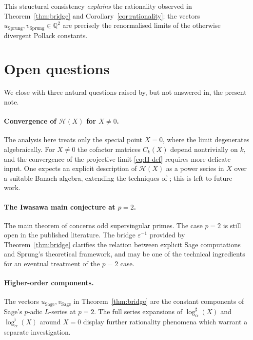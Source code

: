 \documentclass[11pt,a4paper]{amsart}
\theoremstyle{definition}
\newcommand{\Q}{\mathbb{Q}}
\newcommand{\eps}{\varepsilon}
\newcommand{\Hcal}{\mathcal{H}}
\begin{document}
This structural consistency \emph{explains} the rationality observed in Theorem~\ref{thm:bridge} and Corollary~\ref{cor:rationality}: the vectors $u_{\mathrm{Sprung}}, v_{\mathrm{Sprung}} \in \Q^2$ are precisely the renormalised limits of the otherwise divergent Pollack constants.

\section{Open questions}\label{sec:open}

We close with three natural questions raised by, but not answered in, the present note.

\paragraph{Convergence of $\Hcal(X)$ for $X \neq 0$.}
The analysis here treats only the special point $X = 0$, where the limit degenerates algebraically. For $X \neq 0$ the cofactor matrices $C_k(X)$ depend nontrivially on $k$, and the convergence of the projective limit \eqref{eq:H-def} requires more delicate input. One expects an explicit description of $\Hcal(X)$ as a power series in $X$ over a suitable Banach algebra, extending the techniques of \cite{Sprung2012, Sprung2016}; this is left to future work.

\paragraph{The Iwasawa main conjecture at $p = 2$.}
The main theorem of \cite{Sprung2016} concerns odd supersingular primes. The case $p = 2$ is still open in the published literature. The bridge $\eps^{-1}$ provided by Theorem~\ref{thm:bridge} clarifies the relation between explicit Sage computations and Sprung's theoretical framework, and may be one of the technical ingredients for an eventual treatment of the $p = 2$ case.

\paragraph{Higher-order components.}
The vectors $u_{\mathrm{Sage}}, v_{\mathrm{Sage}}$ in Theorem~\ref{thm:bridge} are the constant components of Sage's $p$-adic $L$-series at $p = 2$. The full series expansions of $\log_\alpha^\sharp(X)$ and $\log_\alpha^\flat(X)$ around $X = 0$ display further rationality phenomena which warrant a separate investigation.
\end{document}
